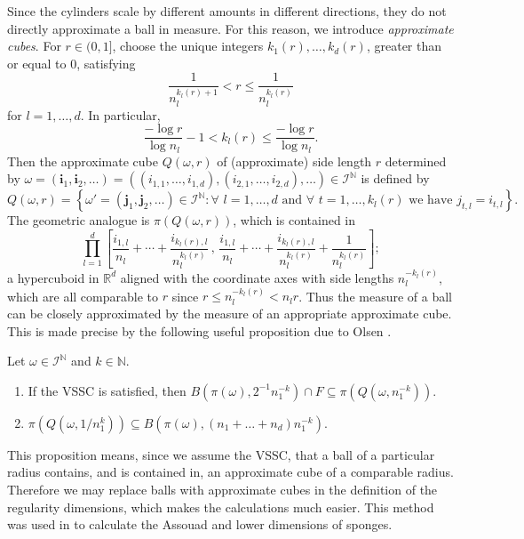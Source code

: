 Since the cylinders scale by different amounts in different directions, they do not directly approximate a ball in measure.  For this reason, we introduce \emph{approximate cubes}. For $r\in (0,1]$, choose the unique integers $k_1(r),\ldots,k_d(r)$, greater than or equal to 0, satisfying
\[
\frac{1}{n_l^{k_l(r)+1}}< r \leq \frac{1}{n_l^{k_l(r)}}
\]
for $l=1,\ldots,d$. In particular, 
\[
\frac{-\log r}{\log n_l}-1 < k_l(r) \leq \frac{-\log r}{\log n_l}.
\]
Then the approximate cube $Q(\omega, r)$ of (approximate) side length $r$ determined by $\omega =\left( \textbf{i}_1, \textbf{i}_2 , \ldots \right) =\left( (i_{1,1}, \dots, i_{1,d}), (i_{2,1}, \dots, i_{2,d}) , \ldots \right)    \in \mathcal{I}^{\mathbb{N}}$ is defined by
\[
Q(\omega, r)=\left\{ \omega'=\left( \textbf{j}_1, \textbf{j}_2 , \ldots \right)\in \mathcal{I}^{\mathbb{N}} : \forall \, \,  l=1, \ldots, d \text{ and } \forall\, \, t= 1, \ldots, k_l(r) \text{ we have } j_{t,l}=i_{t,l} \right\}.
\]
The geometric analogue is $\pi\left(Q(\omega, r)\right)$, which is contained in
\[ 
\prod_{l=1}^d \left[\frac{i_{1,l}}{n_l}+\cdots+\frac{i_{k_l(r),l}}{n_l^{k_l(r)}} \, , \, \frac{i_{1,l}}{n_l}+\cdots+\frac{i_{k_l(r),l}}{n_l^{k_l(r)}}+\frac{1}{n_l^{k_l(r)}} \right];
\]
a hypercuboid in $\mathbb{R}^d$ aligned with the coordinate axes with side lengths $n_l^{-k_l(r)}$, which are all comparable to $r$ since $ r \leq n_l^{-k_l(r)} < n_l r$.  Thus the measure of a ball can be closely approximated by the measure of an appropriate approximate cube.  This is made precise by the following useful proposition due to Olsen \cite[Proposition 6.2.1]{sponges}.
\begin{proposition} \label{ch-upper-reg:ballscubes}
	Let $\omega \in \mathcal{I}^{\mathbb{N}}$ and $k \in \mathbb{N}$.
	\begin{enumerate} 
		\item If the VSSC is satisfied, then $B\left( \pi(\omega), 2^{-1}n_1^{-k}\right)\cap F \subseteq \pi \left(Q\left( \omega, n_1^{-k} \right) \right).$ 
		\item  $\pi \left(Q\left( \omega, 1/n_1^k \right) \right) \subseteq B\left( \pi(\omega), (n_1+\dots+n_d)n_1^{-k}\right).$ 
	\end{enumerate}
\end{proposition}

This proposition means, since we assume the VSSC, that a ball of a particular radius contains, and is contained in, an approximate cube of a comparable radius.  Therefore we may replace balls with approximate cubes in the definition of the regularity dimensions, which makes the calculations much easier. This method was used in \cite[Proposition 3.1 and 3.5]{fraser-howroyd1} to calculate the Assouad and lower dimensions of sponges. 

